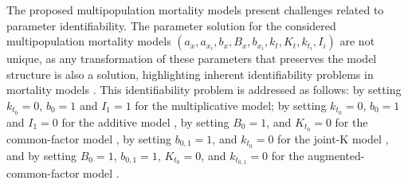 The proposed multipopulation mortality models present challenges related to parameter identifiability. The parameter solution for the considered multipopulation mortality models $\left(a_{x}, a_{x_{i}}, b_{x}, B_{x}, b_{x_{i}}, k_{t}, K_{t}, k_{t_{i}}, I_{i}\right)$ are not unique, as any transformation of these parameters that preserves the model structure is also a solution, highlighting inherent identifiability problems in mortality models \citep{Enchev2017, Villegas2018}. This identifiability problem is addressed as follows: by setting $k_{t_0} = 0$, $b_0 = 1$ and $I_1 = 1$ for the multiplicative model; by setting $k_{t_0} = 0$, $b_0 = 1$ and $I_1 = 0$ for the additive model \citep{Debon2011}, by setting $B_{0}=1$, and $K_{t_0}=0$ for the common-factor model \citep{Carter1992}, by setting $b_{0,1}=1$, and $k_{t_0} = 0$ for the joint-K model \citep{Carter1992}, and by setting $B_{0}=1$, $b_{0,1}=1$, $K_{t_0}=0$, and $k_{t_{0,1}}=0$ for the augmented-common-factor model \citep{Li2005}.

